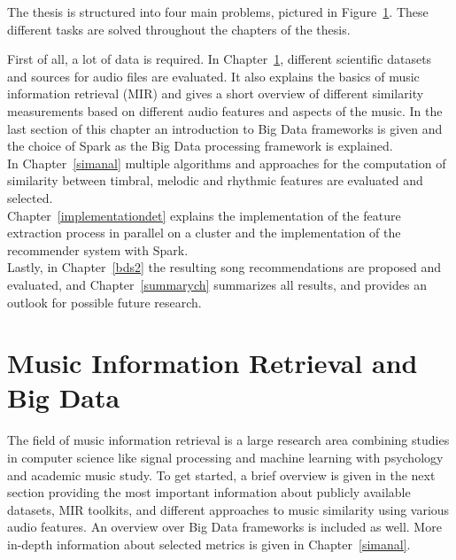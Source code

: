 \noindent The thesis is structured into four main problems, pictured in Figure~\ref{structh}. These different tasks are solved throughout the chapters of the thesis.

\begin{figure}[htbp]
	\centering
	\label{structh}
\end{figure}

\noindent First of all, a lot of data is required. In Chapter~\ref{audiofeat}, different scientific datasets and sources for audio files are evaluated. It also explains the basics of music information retrieval (MIR) and gives a short overview of different similarity measurements based on different audio features and aspects of the music. In the last section of this chapter an introduction to Big Data frameworks is given and the choice of Spark as the Big Data processing framework is explained.\\
In Chapter~\ref{simanal} multiple algorithms and approaches for the computation of similarity between timbral, melodic and rhythmic features are evaluated and selected.\\
Chapter~\ref{implementationdet} explains the implementation of the feature extraction process in parallel on a cluster and the implementation of the recommender system with Spark.\\
Lastly, in Chapter~\ref{bds2} the resulting song recommendations are proposed and evaluated, and Chapter~\ref{summarych} summarizes all results, and provides an outlook for possible future research. 


\chapter{Music Information Retrieval and Big Data}\label{audiofeat}

The field of music information retrieval is a large research area combining studies in computer science like signal processing and machine learning with psychology and academic music study. To get started, a brief overview is given in the next section providing the most important information about publicly available datasets, MIR toolkits, and different approaches to music similarity using various audio features. An overview over Big Data frameworks is included as well. More in-depth information about selected metrics is given in Chapter~\ref{simanal}. 

